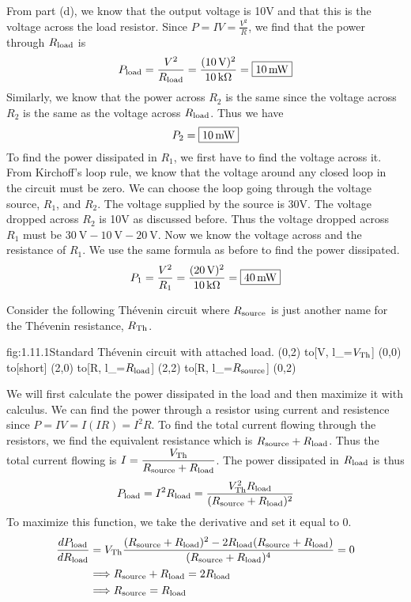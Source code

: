 \begin{enumerate}
    From part (d), we know that the output voltage is 10V and that this is the voltage across the load resistor. Since $P = IV = \frac{V^2}{R}$, we find that the power through $R_{\text{load}}$ is 
    \[P_\load = \frac{V^2}{R_\load} = \frac{(\SI{10}{\V})^2}{\SI{10}{\kohm}} = \mans{\SI{10}{\mW}}\]
    Similarly, we know that the power across $R_2$ is the same since the voltage across $R_2$ is the same as the voltage across $R_{\text{load}}$. Thus we have
    \[P_2 = \mans{\SI{10}{\mW}}\]
    To find the power dissipated in $R_1$, we first have to find the voltage across it. From Kirchoff's loop rule, we know that the voltage around any closed loop in the circuit must be zero. We can choose the loop going through the voltage source, $R_1$, and $R_2$. The voltage supplied by the source is 30V. The voltage dropped across $R_2$ is 10V as discussed before. Thus the voltage dropped across $R_1$ must be $\SI{30}{\V} - \SI{10}{\V} - \SI{20}{\V}$. Now we know the voltage across and the resistance of $R_1$. We use the same formula as before to find the power dissipated.
    \[P_1 = \frac{V^2}{R_1} = \frac{(\SI{20}{\V})^2}{\SI{10}{\kohm}} = \mans{\SI{40}{\mW}}\]
\end{enumerate}

Consider the following Th\'evenin circuit where $R_{\text{source}}$ is just another name for the Th\'evenin resistance, $R_{\text{Th}}$.
\begin{circuit}{fig:1.11.1}{Standard Th\'evenin circuit with attached load.}
    (0,2) to[V, l_=$V_{\text{Th}}$] (0,0)
        to[short] (2,0)
        to[R, l_=$R_{\text{load}}$] (2,2)
        to[R, l_=$R_{\text{source}}$] (0,2)
\end{circuit}
We will first calculate the power dissipated in the load and then maximize it with calculus. We can find the power through a resistor using current and resistence since $P = IV = I(IR) = I^2R$. To find the total current flowing through the resistors, we find the equivalent resistance which is $R_{\text{source}} + R_{\text{load}}$. Thus the total current flowing is $I = \dfrac{V_{\text{Th}}}{R_{\text{source}} + R_{\text{load}}}$. The power dissipated in $R_{\text{load}}$ is thus 
\[P_{\text{load}} = I^2R_{\text{load}} = \dfrac{V_{\text{Th}}^2 R_{\text{load}}}{(R_{\text{source}} + R_{\text{load}})^2}\]
To maximize this function, we take the derivative and set it equal to 0.
\begin{align*}
    \frac{dP_{\text{load}}}{dR_{\text{load}}} &= V_{\text{Th}} \frac{(R_{\text{source}} + R_{\text{load}})^2 - 2R_{\text{load}}(R_{\text{source}} + R_{\text{load}})}{(R_{\text{source}} + R_{\text{load}})^4} = 0 \\
    &\Longrightarrow R_{\text{source}} + R_{\text{load}} = 2R_{\text{load}} \\
    &\Longrightarrow R_{\text{source}} = R_{\text{load}}
\end{align*}

